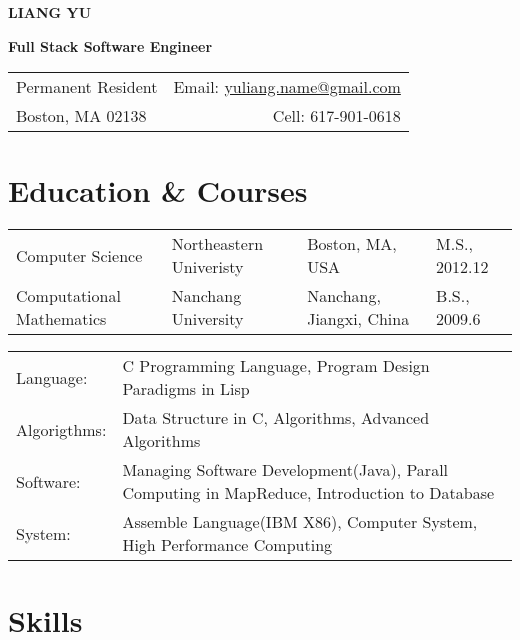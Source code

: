 \documentclass[11pt]{article}
\begin{document}
\pagestyle{CVfooter}

\noindent \textbf{\uppercase{Liang Yu}}
\vspace{2mm}

\noindent \textbf{Full Stack Software Engineer}
\vspace{1mm}

\noindent\begin{tabular*}{\textwidth}{@{\extracolsep{\fill}}l r}
Permanent Resident & Email: \href{mailto:yuliang.name@gmail.com}{yuliang.name@gmail.com} \\
Boston, MA 02138 & Cell: 617-901-0618 \\
\hline
\end{tabular*}


\section{Education \& Courses}

\begin{tabular}{l l l l}
Computer Science & Northeastern Univeristy & Boston, MA, USA & M.S., 2012.12 \\
Computational Mathematics & Nanchang University & Nanchang, Jiangxi, China & B.S., 2009.6 \\
\end{tabular}


\begin{tabular}{l l}
Language: & C Programming Language, Program Design Paradigms in Lisp \\
Algorigthms: & Data Structure in C, Algorithms, Advanced Algorithms \\
Software: & Managing Software Development(Java), Parall Computing in MapReduce, Introduction to Database \\
System: &Assemble Language(IBM X86), Computer System, High Performance Computing \\
\end{tabular}


\section{Skills}
\end{document}
